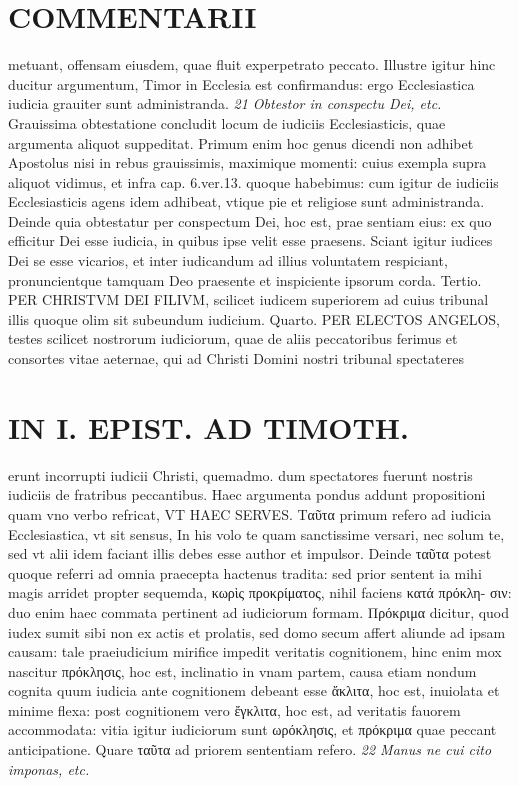 \documentclass{article}
\begin{document}
\begin{pages}
\section*{COMMENTARII }
\marginpar{[ p.136 ]}\pstart metuant, offensam eiusdem, quae fluit experpetrato peccato. Illustre igitur hinc ducitur argumentum, Timor in Ecclesia est confirmandus: ergo Ecclesiastica iudicia grauiter sunt administranda.  \pend
\textit{21 Obtestor in conspectu Dei, etc. }\pstart Grauissima obtestatione concludit locum de iudiciis Ecclesiasticis, quae argumenta aliquot suppeditat. Primum enim hoc genus dicendi non adhibet Apostolus nisi in rebus grauissimis, maximique momenti: cuius exempla supra aliquot vidimus, et infra cap. 6.ver.13. quoque habebimus: cum igitur de iudiciis Ecclesiasticis agens idem adhibeat, vtique pie et religiose sunt administranda. Deinde quia obtestatur per conspectum Dei, hoc est, prae sentiam eius: ex quo efficitur Dei esse iudicia, in quibus ipse velit esse praesens.  \pend\pstart Sciant igitur iudices Dei se esse vicarios, et inter iudicandum ad illius voluntatem respiciant, pronuncientque tamquam Deo praesente et inspiciente ipsorum corda. Tertio. PER CHRISTVM DEI FILIVM, scilicet iudicem superiorem ad cuius tribunal illis quoque olim sit subeundum iudicium. Quarto. PER ELECTOS ANGELOS, testes scilicet nostrorum iudiciorum, quae de aliis peccatoribus ferimus et consortes vitae aeternae, qui ad Christi Domini nostri tribunal spectateres  \pend
\section*{IN I. EPIST. AD TIMOTH. }
\marginpar{[ p.137 ]}\pstart erunt incorrupti iudicii Christi, quemadmo. dum spectatores fuerunt nostris iudiciis de fratribus peccantibus. Haec argumenta pondus addunt propositioni quam vno verbo refricat, VT HAEC SERVES.  \pend\pstart Ταῦτα primum refero ad iudicia Ecclesiastica, vt sit sensus, In his volo te quam sanctissime versari, nec solum te, sed vt alii idem faciant illis debes esse author et impulsor. Deinde ταῦτα potest quoque referri ad omnia praecepta hactenus tradita: sed prior sentent ia mihi magis arridet propter sequemda,  κωρὶς προκρίματος, nihil faciens κατά πρόκλη- σιν: duo enim haec commata pertinent ad iudiciorum formam. Πρόκριμα dicitur, quod iudex sumit sibi non ex actis et prolatis, sed domo secum affert aliunde ad ipsam causam: tale praeiudicium mirifice impedit veritatis cognitionem, hinc enim mox nascitur πρόκλησις, hoc est, inclinatio in vnam partem, causa etiam nondum cognita quum iudicia ante cognitionem debeant esse ἄκλιτα, hoc est, inuiolata et minime flexa: post cognitionem vero ἔγκλιτα, hoc est, ad veritatis fauorem accommodata: vitia igitur iudiciorum sunt ωρόκλησις, et πρόκριμα quae peccant anticipatione. Quare ταῦτα ad priorem sententiam refero.  \pend
\textit{22 Manus ne cui cito imponas, etc. }

\end{pages}
\end{document}
